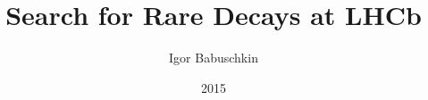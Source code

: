\documentclass[
  BCOR=12mm,
  parskip=half,
  open=any,
]{tudothesis}
\author{Igor Babuschkin}
\title{Search for Rare \bolddecay{} Decays at LHCb}
\date{2015}
\begin{document}
\frontmatter
\maketitle

\makecorrectorpage


\tableofcontents

\mainmatter


\appendix


\backmatter
\printbibliography

\cleardoublepage

\end{document}
